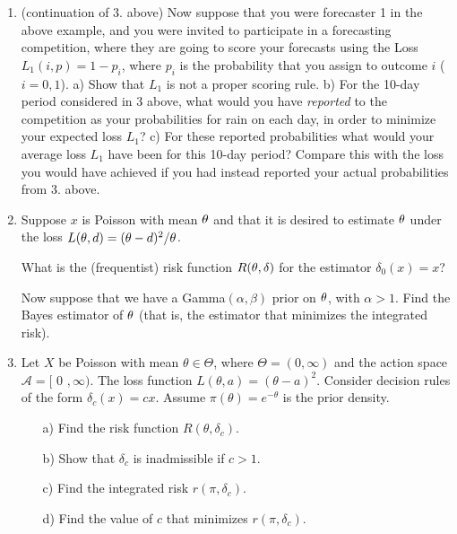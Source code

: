 \begin{enumerate}
\item (continuation of 3. above) Now suppose that you were forecaster 1 in the above example, and you were invited to participate in a forecasting competition, where they are going to score your forecasts using the Loss
$L_1(i,p) = 1-p_i$, where $p_i$ is the probability that you assign to outcome $i$ ($i=0,1$). a) Show that $L_1$ is not a proper scoring rule. b) For the 10-day period considered in 3 above, what would you have {\it reported} to the competition as your probabilities for rain on each day, in order to minimize your expected loss $L_1$? c) For these reported probabilities what would your average loss $L_1$ have been for this 10-day period? Compare this with the loss you would have achieved if you had instead reported your actual probabilities from 3. above. 


\item Suppose $x$ is Poisson with mean $\theta$ and that it is desired to estimate $\theta$ under the loss $L(\theta,d) = (\theta - d)^2/\theta$.  

What is the (frequentist) risk function $R(\theta, \delta)$ for the estimator $\delta_0(x)=x$?

Now suppose that we have a Gamma$(\alpha, \beta)$ prior on $\theta$, with $\alpha>1$.  Find the Bayes estimator of $\theta$  (that is, the estimator
that minimizes the integrated risk).

\item Let $X$ be Poisson with mean $\theta \in \Theta$, where $\Theta = (0,\infty)$ and the action space $\mathcal{A}= [$ 0 $, \infty)$. The loss function $L(\theta,a) = (\theta-a)^2$. Consider decision rules of the form $\delta_c(x) = cx$. Assume $\pi(\theta)=e^{-\theta}$ is the prior density.
\begin{itemize}
\item[a)] Find the risk function $R(\theta, \delta_c)$.
\item[b)] Show that $\delta_c$ is inadmissible if $c>1$.
\item[c)] Find the integrated risk $r(\pi,\delta_c)$.
\item[d)] Find the value of $c$ that minimizes $r(\pi,\delta_c)$.
\end{itemize}






\end{enumerate}
